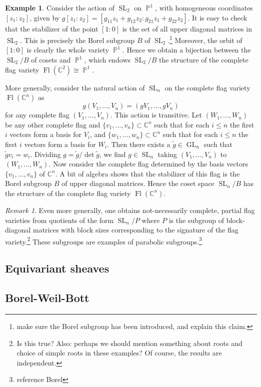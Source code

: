 \documentclass{article}
\newcommand{\C}{\mathbb{C}}
\theoremstyle{plain}
\theoremstyle{definition}
\newtheorem{example}[theorem]{Example}
\theoremstyle{remark}
\newtheorem*{remark}{Remark}
\DeclareMathOperator{\Fl}{Fl}
\DeclareMathOperator{\PP}{\mathbb{P}}
\DeclareMathOperator{\SL}{SL}
\DeclareMathOperator{\GL}{GL}
\begin{document}
\begin{example}
    Consider the action of $\SL_2$ on $\PP^1$, with homogeneous coordinates $[z_1:z_2]$,
    given by $g[z_1:z_2]=[g_{11}z_1+g_{12}z_2:g_{21}z_1+g_{22}z_2]$. It is easy to check
    that the stabilizer of the point $[1:0]$ is the set of all upper diagonal matrices in
    $\SL_2$. This is precisely the Borel subgroup $B$ of $\SL_2$.\footnote{make sure the
    Borel subgroup has been introduced, and explain this claim.} Moreover, the orbit of $[1:0]$
    is clearly the whole variety $\PP^1$. Hence we obtain a bijection between the $\SL_2/B$ of
    cosets and $\PP^1$, which endows $\SL_2/B$ the structure of the complete flag variety
    $\Fl(\C^2)\cong\PP^1$.

    More generally, consider the natural action of $\SL_n$ on the complete flag variety
    $\Fl(\C^n)$ as
    \[g(V_1,\ldots, V_n) = (gV_1,\ldots, gV_n)\]
    for any complete flag $(V_1,\ldots,V_n)$. This action is transitive. Let $(W_1,\ldots,W_n)$ be
    any other complete flag and $\{v_1,\ldots,v_n\}\subset \C^n$ such that for each $i\leqslant n$
    the first $i$ vectors form a basis for $V_i$, and $\{w_1,\ldots,w_n\}\subset \C^n$ such that
    for each $i\leqslant n$ the first $i$ vectors form a basis for $W_i$. Then there exists
    a $\tilde g\in\GL_n$ such that $\tilde gv_i=w_i$. Dividing $g=\tilde g/\det \tilde g$,
    we find $g\in\SL_n$ taking $(V_1,\ldots,V_n)$ to $(W_1,\ldots,W_n)$. Now consider the
    complete flag determined by the basis vectors $\{v_1,\ldots,v_n\}$ of $\C^n$. A bit of algebra
    shows that the stabilizer of this flag is the Borel subgroup $B$ of upper diagonal
    matrices. Hence the coset space $\SL_n/B$ has the structure of the complete flag variety
    $\Fl(\C^n)$.
\end{example}

\begin{remark}
    Even more generally, one obtains not-necessarily complete, partial flag varieties
    from quotients of the form $\SL_n/P$ where $P$ is the subgroup of block-diagonal
    matrices with block sizes corresponding to the signature of the flag variety.\footnote{Is
    this true? Also: perhaps we should mention something about roots and choice of simple
    roots in these examples? Of course, the results are independent.} These subgroups
    are examples of parabolic subgroups.\footnote{reference Borel}
\end{remark}

\subsection{Equivariant sheaves}
\subsection{Borel-Weil-Bott}

\end{document}
